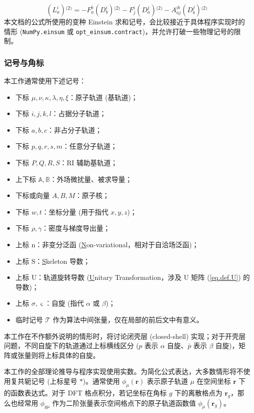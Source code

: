 \begin{equation*}
  (L_a^i){}^\textsf{(2)} = - F_a^b (D_b^i){}^\textsf{(2)} - F_j^i (D_a^j){}^\textsf{(2)} - A_{aj}^{ib} (D_b^j){}^\textsf{(2)}
\end{equation*}
本文档的公式所使用的变种 Einstein 求和记号，会比较接近于具体程序实现时的情形 (\verb|NumPy.einsum| 或 \verb|opt_einsum.contract|)，并允许打破一些物理记号的限制。

\subsubsection{记号与角标}

本工作通常使用下述记号：
\begin{itemize}[nosep]
  \item 下标 $\mu, \nu, \kappa, \lambda, \eta, \xi$：原子轨道 (基轨道)；
  \item 下标 $i, j, k, l$：占据分子轨道；
  \item 下标 $a, b, c$：非占分子轨道；
  \item 下标 $p, q, r, s, m$：任意分子轨道；
  \item 下标 $P, Q, R, S$：RI 辅助基轨道；
  \item 上下标 $\mathbb{A}, \mathbb{B}$：外场微扰量、被求导量；
  \item 下标或向量 $A, B, M$：原子核；
  \item 下标 $w, t$：坐标分量 (用于指代 $x, y, z$)；
  \item 下标 $\rho, \gamma$：密度与梯度导出量；
  \item 上标 $\mathrm{n}$：非变分泛函 (\underline{N}on-variational，相对于自洽场泛函)；
  \item 上标 $\mathrm{S}$：\underline{S}keleton 导数；
  \item 上标 $\mathrm{U}$：轨道旋转导数 (\underline{U}nitary Transformation，涉及 U 矩阵 (\ref{eq.def.U}) 的导数)；
  \item 上标 $\sigma, \varsigma$：自旋 (指代 $\alpha$ 或 $\beta$)；
  \item 临时记号 $\mathscr{T}$ 作为算法中间张量，仅在局部的前后文中有意义。
\end{itemize}

本工作在不作额外说明的情形时，将讨论闭壳层 (closed-shell) 实现；对于开壳层问题，不同自旋下的轨道通过上标横线区分 ($p$ 表示 $\alpha$ 自旋、$\bar p$ 表示 $\beta$ 自旋)，矩阵或张量则将上标具体的自旋。

本工作的全部理论推导与程序实现使用实数。为简化公式表达，大多数情形将不使用复共轭记号 (上标星号 $*$)。通常使用 $\phi_\mu (\bm{r})$ 表示原子轨道 $\mu$ 在空间坐标 $\bm{r}$ 下的函数表达式。对于 DFT 格点积分，若记坐标在角标 $g$ 下的离散格点为 $\bm{r}_g$，那么也经常用 $\phi_{g \mu}$ 作为二阶张量表示空间格点下的原子轨道函数值 $\phi_\mu (\bm{r}_g)$。

